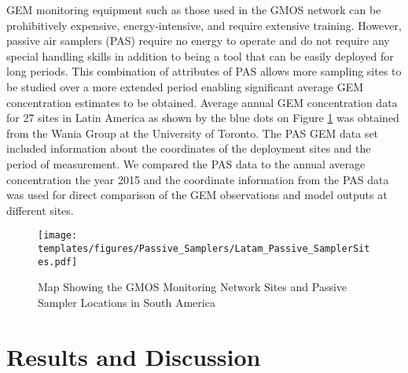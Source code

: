 \begin{flushleft}
GEM monitoring equipment such as those used in the GMOS network can be prohibitively expensive, energy-intensive, and require extensive training. However, passive air samplers (PAS) require no energy to operate and do not require any special handling skills in addition to being a tool that can be easily deployed for long periods. This combination of attributes of PAS allows more sampling sites to be studied over a more extended period enabling significant average GEM concentration estimates to be obtained. Average annual GEM concentration data for 27 sites in Latin America as shown by the blue dots on Figure  \ref{fig:GMOS_PAS_stations_map} was obtained from the Wania Group at the University of Toronto. The PAS GEM data set included information about the coordinates of the deployment sites and the period of measurement. We compared the PAS data to the annual average concentration the year 2015 and the coordinate information from the PAS data was used for direct comparison of the GEM observations and model outputs at different sites.
\end{flushleft}

\begin{figure}[H]
  \texttt{[image: templates/figures/Passive\_Samplers/Latam\_Passive\_SamplerSites.pdf]}
  \caption{Map Showing the GMOS Monitoring Network Sites and Passive Sampler Locations in South America}
  \label{fig:GMOS_PAS_stations_map}
  \centering
  
\end{figure}
\FloatBarrier







\section{Results and Discussion}
